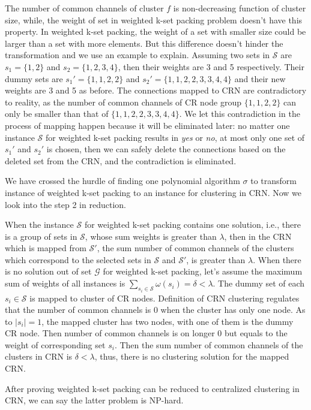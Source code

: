 \documentclass[10pt,journal,compsoc]{IEEEtran}
\makeatletter
\theoremstyle{mytheoremstyle}
\theoremstyle{mytheoremstyle}
\theoremstyle{mytheoremstyle}
\renewenvironment{proof}[1][\proofname]{%
      \par\pushQED{\qed}\fontfamily{ptm}\selectfont%
      \topsep6\p@\@plus6\p@\relax
      \trivlist\item[\hskip\labelsep\bfseries#1\@addpunct{.}]%
      \ignorespaces
    }{%
      \popQED\endtrivlist\@endpefalse
    }
\newcommand{\ie}{i.e., }
\makeatother
\begin{document}
\begin{proof}
\begin{itemize}
The number of common channels of cluster $f$ is non-decreasing function of cluster size, while, the weight of set in weighted k-set packing problem doesn't have this property.
In weighted k-set packing, the weight of a set with smaller size could be larger than a set with more elements.
But this difference doesn't hinder the transformation and we use an example to explain.
Assuming two sets in $\mathcal{S}$ are $s_1=\{1,2\}$ and $s_2=\{1,2,3,4\}$, then their weights are 3 and 5 respectively.
Their dummy sets are $s_1'=\{1,1,2,2\}$ and $s_2'=\{1,1,2,2,3,3,4,4\}$ and their new weights are 3 and 5 as before.
The connections mapped to CRN are contradictory to reality, as the number of common channels of CR node group $\{1,1,2,2\}$ can only be smaller than that of $\{1,1,2,2,3,3,4,4\}$.
We let this contradiction in the process of mapping happen because it will be eliminated later: no matter one instance $\mathcal{S}$ for weighted k-set packing results in \textit{yes} or \textit{no}, at most only one set of $s_1'$ and $s_2'$ is chosen, then we can safely delete the connections based on the deleted set from the CRN, and the contradiction is eliminated.
\end{itemize}






We have crossed the hurdle of finding one polynomial algorithm $\sigma$ to transform instance of weighted k-set packing to an instance for clustering in CRN.
Now we look into the step 2 in reduction.

When the instance $\mathcal{S}$ for weighted k-set packing contains one solution, \ie there is a group of sets in $\mathcal{S}$, whose sum weights is greater than $\lambda$, then in the CRN which is mapped from $\mathcal{S}'$, the sum number of common channels of the clusters which correspond to the selected sets in $\mathcal{S}$ and $\mathcal{S}'$, is greater than $\lambda$.
%
When there is no solution out of set $\mathcal{G}$ for weighted k-set packing, let's assume the maximum sum of weights of all instances is $\sum_{s_i\in \mathcal{S}}\omega(s_i)=\delta < \lambda$. 
The dummy set of each $s_i\in \mathcal{S}$ is mapped to cluster of CR nodes.
Definition of CRN clustering regulates that the number of common channels is 0 when the cluster has only one node.
As to $|s_i|=1$, the mapped cluster has two nodes, with one of them is the dummy CR node.
Then number of common channels is on longer 0 but equals to the weight of corresponding set $s_i$.
Then the sum number of common channels of the clusters in CRN is $\delta < \lambda$, thus, there is no clustering solution for the mapped CRN.

After proving weighted k-set packing can be reduced to centralized clustering in CRN, we can say the latter problem is NP-hard.
\end{proof}
\end{document}
